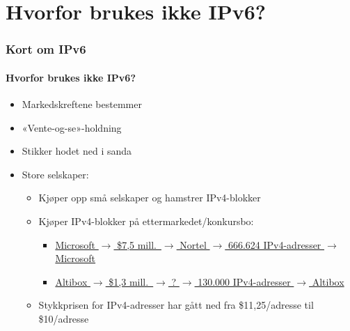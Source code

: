 \section{Hvorfor brukes ikke IPv6?}
\begin{frame}%
  \frametitle{Kort om IPv6}
  \framesubtitle{Hvorfor brukes ikke IPv6?}
  \pause
  \begin{itemize}[<+->]
  \item Markedskreftene bestemmer
  \item «Vente-og-se»-holdning
  \item Stikker hodet ned i sanda
  \item Store selskaper:
    \begin{itemize}[<+->]
    \item Kjøper opp små selskaper og hamstrer IPv4-blokker
    \item Kjøper IPv4-blokker på ettermarkedet/konkursbo:
      \begin{itemize}[<+->]
      \item
        \href{http://www.computerworld.com/s/article/9215055/Microsoft_offers_7.5M_for_666_624_IPv4_addresses}{Microsoft
          \(\to\) \$7,5 mill.\ \(\to\) Nortel \(\to\) 666.624 IPv4-adresser
          \(\to\) Microsoft}
      \item
        \href{http://www.standard.difi.no/filearchive/samf-ok-analyse-ipv6-v0-8.pdf}{Altibox
          \(\to\)
          \$1,3 mill.\ \(\to\)
          ? \(\to\) 130.000 IPv4-adresser \(\to\) Altibox}
      \end{itemize}
    \item Stykkprisen for IPv4-adresser har gått ned fra
      \$11,25/adresse til \$10/adresse
    \end{itemize}
  \end{itemize}
\end{frame}

